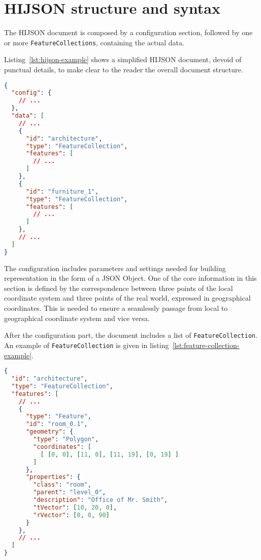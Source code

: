 
\section{HIJSON structure and syntax}\label{hijson-syntax}

The HIJSON document is composed by a configuration section, followed by one or more {\tt FeatureCollections}, containing the actual data.

Listing~\ref{lst:hijson-example} shows a simplified HIJSON document, devoid of punctual details, to make clear to the reader the overall document structure.

\vfill

\begin{lstlisting}[language=json, label={lst:hijson-example}, captionpos=b, caption=Example of HIJSON document.]
{
  "config": {
    // ...
  },
  "data": [
    // ...
    {
      "id": "architecture",
      "type": "FeatureCollection",
      "features": [
        // ...
      ] 
    },
    {
      "id": "furniture_1",
      "type": "FeatureCollection",
      "features": [
        // ...
      ] 
    },
    // ...
  ]
}
\end{lstlisting}


The configuration includes parameters and settings needed for building representation in the form of a JSON Object. One of the core information in this section is defined by the correspondence between three points of the local coordinate system and three points of the real world, expressed in geographical coordinates. This is needed to ensure a seamlessly passage from local to geographical coordinate system and vice versa.

After the configuration part, the document includes a list of {\tt FeatureCollection}. An example
of {\tt FeatureCollection} is given in listing~\ref{lst:feature-collection-example}.


\begin{lstlisting}[language=json, label={lst:feature-collection-example}, captionpos=b,  caption=Example of {\tt FeatureCollection}.]
{
  "id": "architecture",
  "type": "FeatureCollection",
  "features": [
    // ...
    {
      "type": "Feature",
      "id": "room_0.1",
      "geometry": {
        "type": "Polygon",
        "coordinates": [
          [ [0, 0], [11, 0], [11, 19], [0, 19] ]
        ]
      },
      "properties": {
        "class": "room",
        "parent": "level_0",
        "description": "Office of Mr. Smith",
        "tVector": [10, 20, 0],
        "rVector": [0, 0, 90]
      }
    },
    // ...
  ]
}
\end{lstlisting}

